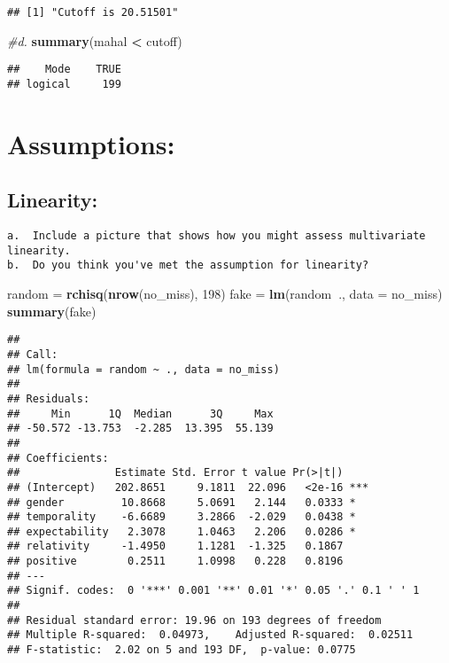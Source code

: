 \documentclass[
]{article}
\newenvironment{Shaded}{\begin{snugshade}}{\end{snugshade}}
\newcommand{\CommentTok}[1]{\textcolor[rgb]{0.56,0.35,0.01}{\textit{#1}}}
\newcommand{\DataTypeTok}[1]{\textcolor[rgb]{0.13,0.29,0.53}{#1}}
\newcommand{\DecValTok}[1]{\textcolor[rgb]{0.00,0.00,0.81}{#1}}
\newcommand{\KeywordTok}[1]{\textcolor[rgb]{0.13,0.29,0.53}{\textbf{#1}}}
\newcommand{\NormalTok}[1]{#1}
\newcommand{\OperatorTok}[1]{\textcolor[rgb]{0.81,0.36,0.00}{\textbf{#1}}}
\newcommand{\StringTok}[1]{\textcolor[rgb]{0.31,0.60,0.02}{#1}}
\begin{document}
\begin{verbatim}
## [1] "Cutoff is 20.51501"
\end{verbatim}

\begin{Shaded}
\begin{Highlighting}[]
\CommentTok{#d.}
\KeywordTok{summary}\NormalTok{(mahal }\OperatorTok{<}\StringTok{ }\NormalTok{cutoff)}
\end{Highlighting}
\end{Shaded}

\begin{verbatim}
##    Mode    TRUE 
## logical     199
\end{verbatim}

\hypertarget{assumptions}{%
\section{Assumptions:}\label{assumptions}}

\hypertarget{linearity}{%
\subsection{Linearity:}\label{linearity}}

\begin{verbatim}
a.  Include a picture that shows how you might assess multivariate linearity.
b.  Do you think you've met the assumption for linearity? 
\end{verbatim}

\begin{Shaded}
\begin{Highlighting}[]
\NormalTok{random =}\StringTok{ }\KeywordTok{rchisq}\NormalTok{(}\KeywordTok{nrow}\NormalTok{(no_miss), }\DecValTok{198}\NormalTok{)}
\NormalTok{fake =}\StringTok{ }\KeywordTok{lm}\NormalTok{(random}\OperatorTok{~}\NormalTok{., }\DataTypeTok{data =}\NormalTok{ no_miss)}
\KeywordTok{summary}\NormalTok{(fake)}
\end{Highlighting}
\end{Shaded}

\begin{verbatim}
## 
## Call:
## lm(formula = random ~ ., data = no_miss)
## 
## Residuals:
##     Min      1Q  Median      3Q     Max 
## -50.572 -13.753  -2.285  13.395  55.139 
## 
## Coefficients:
##               Estimate Std. Error t value Pr(>|t|)    
## (Intercept)   202.8651     9.1811  22.096   <2e-16 ***
## gender         10.8668     5.0691   2.144   0.0333 *  
## temporality    -6.6689     3.2866  -2.029   0.0438 *  
## expectability   2.3078     1.0463   2.206   0.0286 *  
## relativity     -1.4950     1.1281  -1.325   0.1867    
## positive        0.2511     1.0998   0.228   0.8196    
## ---
## Signif. codes:  0 '***' 0.001 '**' 0.01 '*' 0.05 '.' 0.1 ' ' 1
## 
## Residual standard error: 19.96 on 193 degrees of freedom
## Multiple R-squared:  0.04973,    Adjusted R-squared:  0.02511 
## F-statistic:  2.02 on 5 and 193 DF,  p-value: 0.0775
\end{verbatim}
\end{document}
